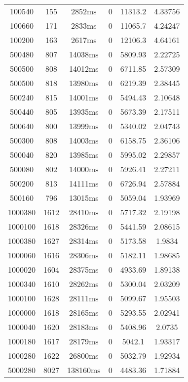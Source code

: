 \documentclass[./main.tex]{subfiles}
\begin{document}
\begin{table}
\begin{tabular}{ c | c | c | c | c | c }
        \rowcolor{lightgray} 100540 & 155 & 2852ms & 0 & 11313.2 & 4.33756 \\
        100660 & 171 & 2833ms & 0 & 11065.7 & 4.24247 \\
        100200 & 163 & 2617ms & 0 & 12106.3 & 4.64161 \\
        \hline
        500480 & 807 & 14038ms & 0 & 5809.93 & 2.22725 \\
        500500 & 808 & 14012ms & 0 & 6711.85 & 2.57309 \\
        500500 & 818 & 13980ms & 0 & 6219.39 & 2.38445 \\
        500240 & 815 & 14001ms & 0 & 5494.43 & 2.10648 \\
        500440 & 805 & 13935ms & 0 & 5673.39 & 2.17511 \\
        500640 & 800 & 13999ms & 0 & 5340.02 & 2.04743 \\
        500300 & 808 & 14003ms & 0 & 6158.75 & 2.36106 \\
        500040 & 820 & 13985ms & 0 & 5995.02 & 2.29857 \\
        \rowcolor{lightgray} 500080 & 802 & 14000ms & 0 & 5926.41 & 2.27211 \\
        500200 & 813 & 14111ms & 0 & 6726.94 & 2.57884 \\
        500160 & 796 & 13015ms & 0 & 5059.04 & 1.93969 \\
        \hline
        1000380 & 1612 & 28410ms & 0 & 5717.32 & 2.19198 \\
        1000100 & 1618 & 28326ms & 0 & 5441.59 & 2.08615 \\
        1000380 & 1627 & 28314ms & 0 & 5173.58 & 1.9834 \\
        \rowcolor{lightgray} 1000060 & 1616 & 28306ms & 0 & 5182.11 & 1.98685 \\
        1000020 & 1604 & 28375ms & 0 & 4933.69 & 1.89138 \\
        1000340 & 1610 & 28262ms & 0 & 5300.04 & 2.03209 \\
        1000100 & 1628 & 28111ms & 0 & 5099.67 & 1.95503 \\
        1000000 & 1618 & 28165ms & 0 & 5293.55 & 2.02941 \\
        1000040 & 1620 & 28183ms & 0 & 5408.96 & 2.0735 \\
        1000180 & 1617 & 28179ms & 0 & 5042.1 & 1.93317 \\
        1000280 & 1622 & 26800ms & 0 & 5032.79 & 1.92934 \\
        \hline
        5000280 & 8027 & 138160ms & 0 & 4483.36 & 1.71884 \\

\end{tabular}
\end{table}
\end{document}

